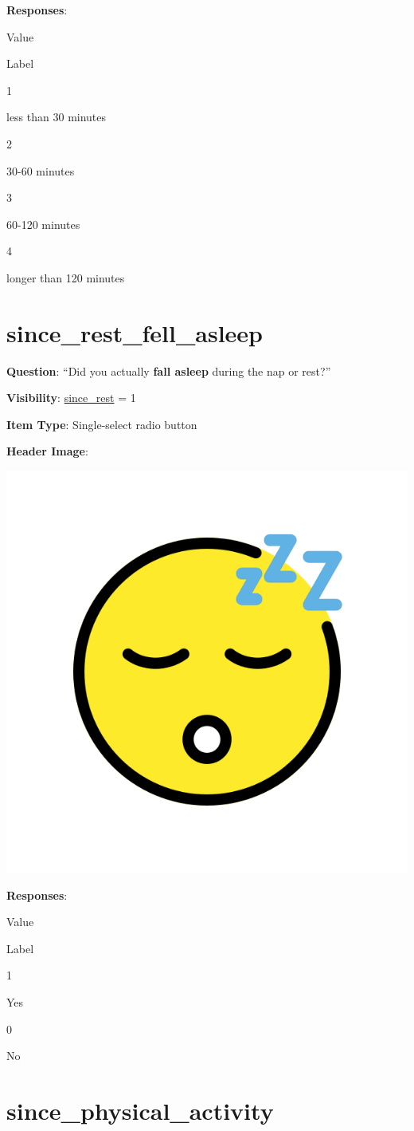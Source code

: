 \documentclass[]{book}
\begin{document}
\textbf{Responses}:

Value

Label

1

less than 30 minutes

2

30-60 minutes

3

60-120 minutes

4

longer than 120 minutes

\hypertarget{since_rest_fell_asleep}{%
\section{since\_rest\_fell\_asleep}\label{since_rest_fell_asleep}}

\textbf{Question}: ``Did you actually \textbf{fall asleep} during the nap or rest?''

\textbf{Visibility}: \protect\hyperlink{since_rest}{since\_rest} = 1

\textbf{Item Type}: Single-select radio button

\textbf{Header Image}:

\begin{flushleft}\includegraphics[width=0.33\linewidth]{downloadFigs4latex_NIMH_Applet_Codebook/since_rest_fell_asleep_headerImg} \end{flushleft}

\textbf{Responses}:

Value

Label

1

Yes

0

No

\hypertarget{since_physical_activity}{%
\section{since\_physical\_activity}\label{since_physical_activity}}
\end{document}
